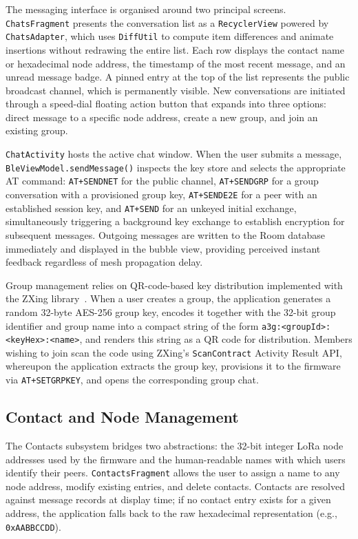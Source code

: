 \documentclass[english,bachelor]{tfgitic}[2026/01/22]
\begin{document}
The messaging interface is organised around two principal screens. \texttt{ChatsFragment} presents the conversation list as a \texttt{RecyclerView} powered by \texttt{ChatsAdapter}, which uses \texttt{DiffUtil} to compute item differences and animate insertions without redrawing the entire list. Each row displays the contact name or hexadecimal node address, the timestamp of the most recent message, and an unread message badge. A pinned entry at the top of the list represents the public broadcast channel, which is permanently visible. New conversations are initiated through a speed-dial floating action button that expands into three options: direct message to a specific node address, create a new group, and join an existing group.

\texttt{ChatActivity} hosts the active chat window. When the user submits a message, \texttt{BleViewModel.sendMessage()} inspects the key store and selects the appropriate AT command: \texttt{AT+SENDNET} for the public channel, \texttt{AT+SENDGRP} for a group conversation with a provisioned group key, \texttt{AT+SENDE2E} for a peer with an established session key, and \texttt{AT+SEND} for an unkeyed initial exchange, simultaneously triggering a background key exchange to establish encryption for subsequent messages. Outgoing messages are written to the Room database immediately and displayed in the bubble view, providing perceived instant feedback regardless of mesh propagation delay.

Group management relies on QR-code-based key distribution implemented with the ZXing library~\cite{zxing2024}. When a user creates a group, the application generates a random 32-byte AES-256 group key, encodes it together with the 32-bit group identifier and group name into a compact string of the form \texttt{a3g:<groupId>:<keyHex>:<name>}, and renders this string as a QR code for distribution. Members wishing to join scan the code using ZXing's \texttt{ScanContract} Activity Result API, whereupon the application extracts the group key, provisions it to the firmware via \texttt{AT+SETGRPKEY}, and opens the corresponding group chat.

\subsection{Contact and Node Management}

The Contacts subsystem bridges two abstractions: the 32-bit integer LoRa node addresses used by the firmware and the human-readable names with which users identify their peers. \texttt{ContactsFragment} allows the user to assign a name to any node address, modify existing entries, and delete contacts. Contacts are resolved against message records at display time; if no contact entry exists for a given address, the application falls back to the raw hexadecimal representation (e.g., \texttt{0xAABBCCDD}).
\end{document}
